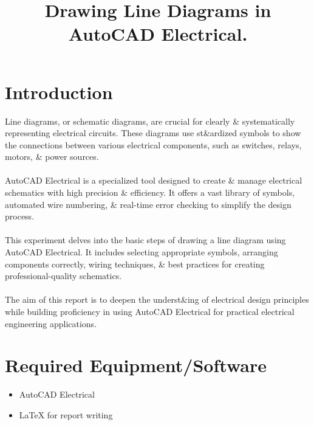 \documentclass[12pt]{article}
\title{Drawing Line Diagrams in AutoCAD Electrical.}
\author{}
\date{}
\begin{document}


\pagebreak

\tableofcontents

\pagebreak
{}
\maketitle

\section*{Introduction}
Line diagrams, or schematic diagrams, are crucial for clearly \& systematically representing electrical circuits. These diagrams use st\&ardized symbols to show the connections between various electrical components, such as switches, relays, motors, \& power sources.
\\\\
AutoCAD Electrical is a specialized tool designed to create \& manage electrical schematics with high precision \& efficiency. It offers a vast library of symbols, automated wire numbering, \& real-time error checking to simplify the design process.
\\\\
This experiment delves into the basic steps of drawing a line diagram using AutoCAD Electrical. It includes selecting appropriate symbols, arranging components correctly, wiring techniques, \& best practices for creating professional-quality schematics.
\\\\
The aim of this report is to deepen the underst\&ing of electrical design principles while building proficiency in using AutoCAD Electrical for practical electrical engineering applications.

\section*{Required Equipment/Software}
\begin{itemize}
    \item AutoCAD Electrical
    \item \LaTeX{} for report writing
\end{itemize}
\end{document}
